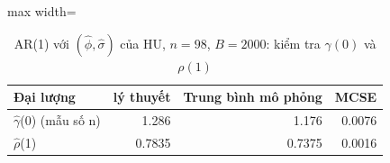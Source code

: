 \begin{table}[H]
\centering\small
\caption{AR(1) với $(\hat\phi,\hat\sigma)$ của HU, $n=98$, $B=2000$: kiểm tra $\gamma(0)$ và $\rho(1)$}\label{tab:tab_b11_06_ar1_simulation}
\begin{adjustbox}{max width=\linewidth}
\begin{tabular}{lrrr}
\toprule
Đại lượng & lý thuyết & Trung bình mô phỏng & MCSE \\
\midrule
$\hat{\gamma}$(0) (mẫu số n) & 1.286 & 1.176 & 0.0076 \\
$\hat{\rho}$(1) & 0.7835 & 0.7375 & 0.0016 \\
\bottomrule
\end{tabular}
\end{adjustbox}
\end{table}

